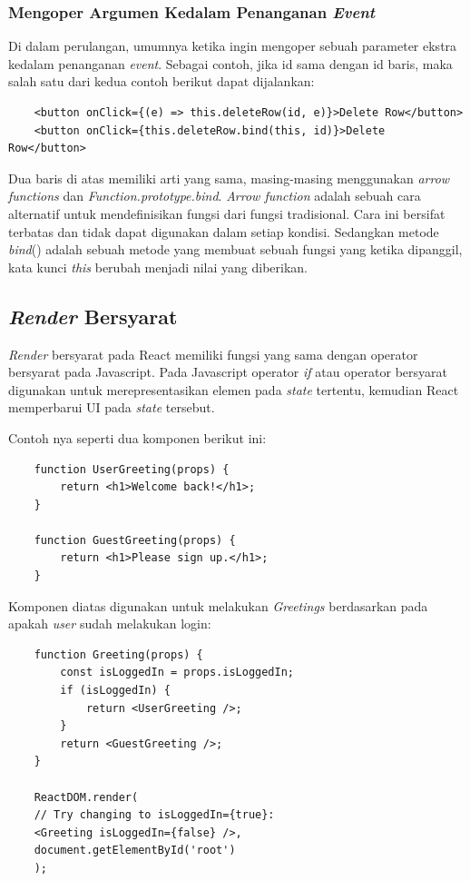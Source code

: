 \subsubsection{Mengoper Argumen Kedalam Penanganan \textit{Event}}
Di dalam perulangan, umumnya ketika ingin mengoper sebuah parameter ekstra kedalam penanganan \textit{event}. Sebagai contoh, jika id sama dengan id baris, maka salah satu dari kedua contoh berikut dapat dijalankan:
\begin{lstlisting}
	<button onClick={(e) => this.deleteRow(id, e)}>Delete Row</button>
	<button onClick={this.deleteRow.bind(this, id)}>Delete Row</button>
\end{lstlisting}
Dua baris di atas memiliki arti yang sama, masing-masing menggunakan \textit{arrow functions} dan \textit{Function.prototype.bind}.
\textit{Arrow function} adalah sebuah cara alternatif untuk mendefinisikan fungsi dari fungsi tradisional. Cara ini bersifat terbatas dan tidak dapat digunakan dalam setiap kondisi. Sedangkan metode \textit{bind}() adalah sebuah metode yang membuat sebuah fungsi yang ketika dipanggil, kata kunci \textit{this} berubah menjadi nilai yang diberikan.

\subsection{\textit{Render} Bersyarat}
\textit{Render} bersyarat pada React memiliki fungsi yang sama dengan operator bersyarat pada Javascript. Pada Javascript operator \textit{if} atau operator bersyarat digunakan untuk merepresentasikan elemen pada \textit{state} tertentu, kemudian React memperbarui UI pada \textit{state} tersebut.

Contoh nya seperti dua komponen berikut ini:
\begin{lstlisting}
	function UserGreeting(props) {
		return <h1>Welcome back!</h1>;
	}
	
	function GuestGreeting(props) {
		return <h1>Please sign up.</h1>;
	}
\end{lstlisting}
Komponen diatas digunakan untuk melakukan \textit{Greetings} berdasarkan pada apakah \textit{user} sudah melakukan login:
\begin{lstlisting}
	function Greeting(props) {
		const isLoggedIn = props.isLoggedIn;
		if (isLoggedIn) {
			return <UserGreeting />;
		}
		return <GuestGreeting />;
	}
	
	ReactDOM.render(
	// Try changing to isLoggedIn={true}:
	<Greeting isLoggedIn={false} />,
	document.getElementById('root')
	);
\end{lstlisting} 

